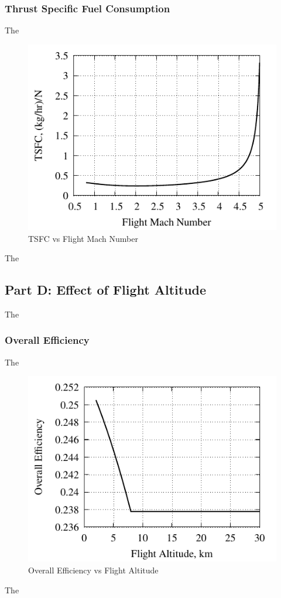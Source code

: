 \documentclass[conf]{new-aiaa} %
\begin{document}
\subsubsection{Thrust Specific Fuel Consumption}
The

\begin{figure}[hbt!] %
    \centering
    \includegraphics[]{media/performance_parameter_files/part_c_TSFC.pdf}
    \caption{\label{fig:partctsfc}TSFC vs Flight Mach Number}
\end{figure}
The

\subsection{Part D: Effect of Flight Altitude}
The

\subsubsection{Overall Efficiency}
The

\begin{figure}[hbt!] %
    \centering
    \includegraphics[]{media/performance_parameter_files/part_d_eta_o.pdf}
    \caption{\label{fig:partdetao}Overall Efficiency vs Flight Altitude}
\end{figure}
The
\end{document}
